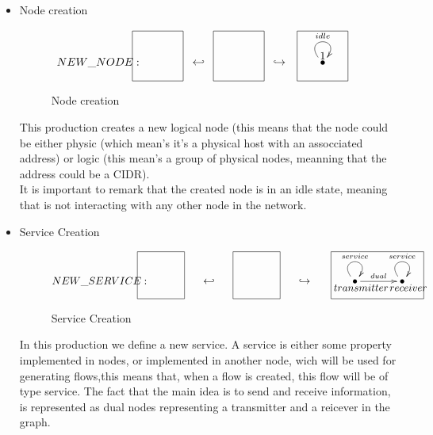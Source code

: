 \documentclass[envcountsect,runningheads]{llncs}
\begin{document}
\begin{itemize}
  \item Node creation
  \begin{figure}[H]
    \[
       \xymatrix@C=25pt@R=16pt
       {
         {}
         \POS[]-<4.5pc,0pc>\drop{NEW\_NODE:}
         \POS[]+<0pc,.5pc> *+=<3.8pc,3.8pc>[F-]{} & {\hookleftarrow} &
         {}
         \POS[]+<0pc,.5pc> *+=<3.8pc,3.8pc>[F-]{} & {\hookrightarrow} &
         {\bullet} \ar@(ul,ur)^{idle}
         \POS[]+<0pc,.5pc> *+=<3.8pc,3.8pc>[F-]{1} &
       }
    \]
    \caption{Node creation}
    \protect\label{fig:nodecreation}
  \end{figure}
  This production creates a new logical node (this means that 
  the node could be either physic (which mean's it's a physical host with an 
  assocciated address) or logic (this mean's a group of physical nodes, meanning
  that the address could be a CIDR). \\
  It is important to remark that the created node is in an idle state, meaning 
  that is not interacting with any other node in the network. \\ 
  
  \item Service Creation
  \begin{figure}[H]
    \[
       \xymatrix@C=35pt@R=16pt
       {
        {}
         \POS[]-<5pc,0pc>\drop{NEW\_SERVICE:}
         \POS[]+<0pc,.5pc> *+=<3.8pc,3.8pc>[F-]{} & {\hookleftarrow} &
         {}
         \POS[]+<0pc,.5pc> *+=<3.8pc,3.8pc>[F-]{} & {\hookrightarrow} &
         {\bullet} \ar@(ul,ur)^{service} \ar@{->}^{dual}[r] \POS[]-<-0.5pc,.5pc> \drop{transmitter} 
         &
         {\bullet} \ar@(ul,ur)^{service} \POS[]-<-0.5pc,.5pc> \drop{receiver}
         \POS[]+<-2pc,.5pc> *+=<7.5pc,3.8pc>[F-]{} &
      }
    \]
    \caption{Service Creation}
    \protect\label{fig:servicecreation}
  \end{figure}
  In this production we define a new service. A service is either some property 
  implemented in nodes, or implemented in another node, wich will be used for generating 
  flows,this means that, when a flow is created, this flow will be of type service. The fact that the
  main idea is to send and receive information, is represented as dual nodes representing a 
  transmitter and a reicever in the graph.\\
  

\end{itemize}
\end{document}
